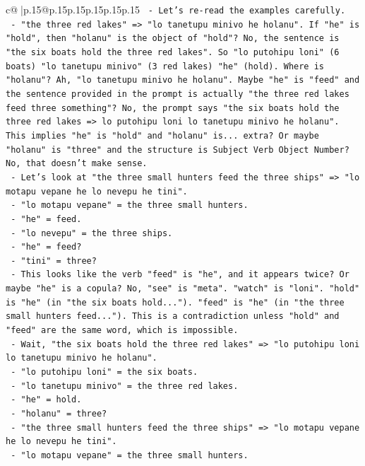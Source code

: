 \documentclass{article}
\begin{document}
{\begin{supertabular}{c@{$\;$}|p{.15\linewidth}@{}p{.15\linewidth}p{.15\linewidth}p{.15\linewidth}p{.15\linewidth}p{.15\linewidth}}
{{{\texttt{    {-} Let's re{-}read the examples carefully.} \\
\texttt{      {-} "the three red lakes" => "lo tanetupu minivo he holanu". If "he" is "hold", then "holanu" is the object of "hold"? No, the sentence is "the six boats hold the three red lakes". So "lo putohipu loni" (6 boats) "lo tanetupu minivo" (3 red lakes) "he" (hold). Where is "holanu"? Ah, "lo tanetupu minivo he holanu". Maybe "he" is "feed" and the sentence provided in the prompt is actually "the three red lakes feed three something"? No, the prompt says "the six boats hold the three red lakes => lo putohipu loni lo tanetupu minivo he holanu". This implies "he" is "hold" and "holanu" is... extra? Or maybe "holanu" is "three" and the structure is Subject Verb Object Number? No, that doesn't make sense.} \\
\texttt{      {-} Let's look at "the three small hunters feed the three ships" => "lo motapu vepane he lo nevepu he tini".} \\
\texttt{        {-} "lo motapu vepane" = the three small hunters.} \\
\texttt{        {-} "he" = feed.} \\
\texttt{        {-} "lo nevepu" = the three ships.} \\
\texttt{        {-} "he" = feed?} \\
\texttt{        {-} "tini" = three?} \\
\texttt{        {-} This looks like the verb "feed" is "he", and it appears twice? Or maybe "he" is a copula? No, "see" is "meta". "watch" is "loni". "hold" is "he" (in "the six boats hold..."). "feed" is "he" (in "the three small hunters feed..."). This is a contradiction unless "hold" and "feed" are the same word, which is impossible.} \\
\texttt{        {-} Wait, "the six boats hold the three red lakes" => "lo putohipu loni lo tanetupu minivo he holanu".} \\
\texttt{          {-} "lo putohipu loni" = the six boats.} \\
\texttt{          {-} "lo tanetupu minivo" = the three red lakes.} \\
\texttt{          {-} "he" = hold.} \\
\texttt{          {-} "holanu" = three?} \\
\texttt{        {-} "the three small hunters feed the three ships" => "lo motapu vepane he lo nevepu he tini".} \\
\texttt{          {-} "lo motapu vepane" = the three small hunters.} \\
}}}
\end{supertabular}}
\end{document}
